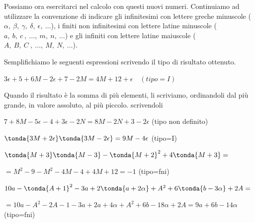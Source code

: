 Possiamo ora esercitarci nel calcolo con questi nuovi numeri. 
Continuiamo ad utilizzare la convenzione di indicare gli 
infinitesimi con lettere greche minuscole
($\alpha,~\beta,~\gamma,~\delta,~\epsilon,~\dots$), 
i finiti non infinitesimi con lettere latine minuscole 
($a,~b,~c~,~\dots,~m,~n,~\dots$) 
e gli infiniti con lettere latine maiuscole 
($A,~B,~C~,~\dots,~M,~N,~\dots$).

\begin{exrig}
Semplifichiamo le seguenti espressioni scrivendo il tipo di risultato 
ottenuto.

 \begin{esempio}
  $3\epsilon +5 +6M -2\epsilon +7 -2M = 4M +12 +\epsilon \quad (tipo=I)$
 \end{esempio}

\begin{osservazione}
Quando il risultato è la somma di più elementi, li scriviamo, ordinandoli dal 
più grande, in valore assoluto, al più piccolo.
scrivendoli 
\end{osservazione}

 \begin{esempio}
\(7 +8M -5\epsilon  -4 +3\epsilon-2N = 8M -2N +3 -2\epsilon\)
\quad (tipo non definito)
 \end{esempio}
 
 \begin{esempio}
\(\tonda{3M +2\epsilon} \tonda{3M -2\epsilon} = 9M -4\epsilon\)
\quad (tipo=I)
 \end{esempio}
 
 \begin{esempio}
\(\tonda{M +3} \tonda{M -3} - \tonda{M+2}^2 +4\tonda{M +3}=\)

\(=M^2 -9 -M^2 -4M -4 +4M +12 = -1\)
\quad (tipo=fni)
 \end{esempio}
 
 \begin{esempio}
\(10a -\tonda{A +1}^2 -3a +2\tonda{a+2\alpha} +A^2 +6\tonda{b -3\alpha} +2A= 
\)

\(=10a -A^2 -2A -1 -3a +2a+4\alpha +A^2 +6b -18\alpha +2A = 9a +6b 
-14\alpha\) 
\quad (tipo=fni)
 \end{esempio}
\end{exrig}


